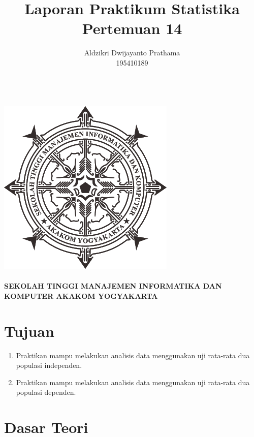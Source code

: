 \documentclass[a4paper,12pt]{article}
\begin{document}
\title{Laporan Praktikum Statistika Pertemuan 14}
\author{Aldzikri Dwijayanto Prathama 
	\\195410189}
\makeatletter
\begin{titlepage}
	\begin{center}
		{\huge \bfseries \@title }\\[14ex]
		\includegraphics[scale=.8]{logo}\\[4ex]
		{\large \@author}\\[20ex]
		{\large \bfseries {SEKOLAH TINGGI MANAJEMEN INFORMATIKA DAN KOMPUTER
				AKAKOM YOGYAKARTA}}
	\end{center}


\end{titlepage}
\makeatother
\newpage
\tableofcontents
\newpage
\section{Tujuan}
\begin{enumerate}
    \item Praktikan mampu melakukan analisis data menggunakan uji rata-rata dua populasi independen.
    \item Praktikan mampu melakukan analisis data menggunakan uji rata-rata dua populasi dependen.
\end{enumerate}

\section{Dasar Teori}
\end{document}
